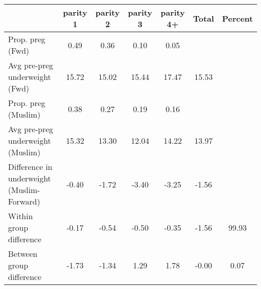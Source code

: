 \begin{tabular}{l*{6}{c}}
\toprule
            &\multicolumn{1}{c}{parity 1}&\multicolumn{1}{c}{parity 2}&\multicolumn{1}{c}{parity 3}&\multicolumn{1}{c}{parity 4+}&\multicolumn{1}{c}{Total}&\multicolumn{1}{c}{Percent}\\
\midrule
\midrule
Prop. preg (Fwd)&        0.49&        0.36&        0.10&        0.05&            &            \\
Avg pre-preg underweight (Fwd)&       15.72&       15.02&       15.44&       17.47&       15.53&            \\
Prop. preg (Muslim)&        0.38&        0.27&        0.19&        0.16&            &            \\
Avg pre-preg underweight (Muslim)&       15.32&       13.30&       12.04&       14.22&       13.97&            \\
Difference in underweight (Muslim-Forward)&       -0.40&       -1.72&       -3.40&       -3.25&       -1.56&            \\
Within group difference&       -0.17&       -0.54&       -0.50&       -0.35&       -1.56&       99.93\\
Between group difference&       -1.73&       -1.34&        1.29&        1.78&       -0.00&        0.07\\
\bottomrule
\end{tabular}
